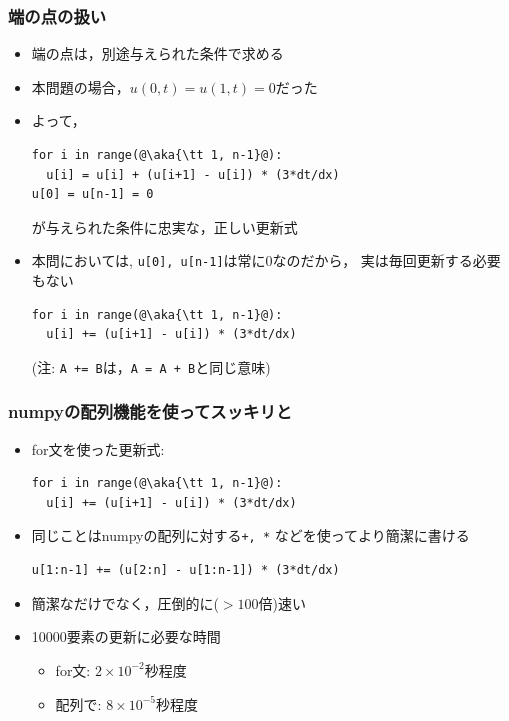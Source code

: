 \documentclass[12pt,dvipdfmx]{beamer}
\newcommand{\aka}[1]{{\color{red}#1}}
\begin{document}
\begin{frame}[fragile]
\frametitle{端の点の扱い}
\begin{itemize}
\item 端の点は，別途与えられた条件で求める
\item 本問題の場合，$u(0,t) = u(1,t) = 0$だった
\item よって，
\begin{lstlisting}
for i in range(@\aka{\tt 1, n-1}@):
  u[i] = u[i] + (u[i+1] - u[i]) * (3*dt/dx)
u[0] = u[n-1] = 0
\end{lstlisting}
が与えられた条件に忠実な，正しい更新式
\item 本問においては, {\tt u[0], u[n-1]}は常に0なのだから，
実は毎回更新する必要もない
\begin{lstlisting}
for i in range(@\aka{\tt 1, n-1}@):
  u[i] += (u[i+1] - u[i]) * (3*dt/dx)
\end{lstlisting}
(注: {\tt A += B}は，{\tt A = A + B}と同じ意味)
\end{itemize}
\end{frame}


\begin{frame}[fragile]
\frametitle{numpyの配列機能を使ってスッキリと}
\begin{itemize}
\item for文を使った更新式:
\begin{lstlisting}
for i in range(@\aka{\tt 1, n-1}@):
  u[i] += (u[i+1] - u[i]) * (3*dt/dx)
\end{lstlisting}

\item 同じことはnumpyの配列に対する{\tt +, *}
などを使ってより簡潔に書ける
\begin{lstlisting}
u[1:n-1] += (u[2:n] - u[1:n-1]) * (3*dt/dx)
\end{lstlisting}

\item 簡潔なだけでなく，圧倒的に($>100$倍)速い
\item 10000要素の更新に必要な時間
  \begin{itemize}
  \item for文: $2 \times 10^{-2}$秒程度
  \item 配列で: $8 \times 10^{-5}$秒程度
  \end{itemize}
\end{itemize}

\end{frame}
\end{document}
